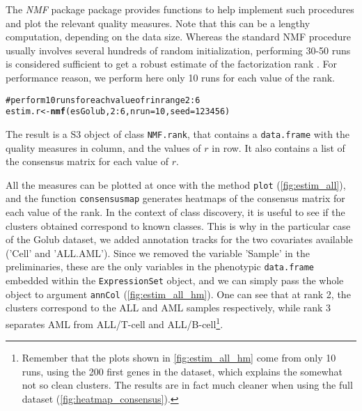 \documentclass[a4paper]{article}\usepackage{graphicx, color}
\makeatletter
\newcommand{\hlfunctioncall}[1]{\textcolor[rgb]{0.501960784313725,0,0.329411764705882}{\textbf{#1}}}%
\newcommand{\hlcomment}[1]{\textcolor[rgb]{0.180392156862745,0.6,0.341176470588235}{#1}}%
\newenvironment{kframe}{%
 \def\at@end@of@kframe{}%
 \ifinner\ifhmode%
  \def\at@end@of@kframe{\end{minipage}}%
  \begin{minipage}{\columnwidth}%
 \fi\fi%
 \def\FrameCommand##1{\hskip\@totalleftmargin \hskip-\fboxsep
 \colorbox{shadecolor}{##1}\hskip-\fboxsep
     \hskip-\linewidth \hskip-\@totalleftmargin \hskip\columnwidth}%
 \MakeFramed {\advance\hsize-\width
   \@totalleftmargin\z@ \linewidth\hsize
   \@setminipage}}%
 {\par\unskip\endMakeFramed%
 \at@end@of@kframe}
\newenvironment{knitrout}{}{} %
\let\code=\texttt
\newcommand{\pkgname}[1]{\textit{#1}\xspace}
\newcommand{\Rpkg}[1]{\pkgname{#1} package\xspace}
\newcommand{\nmfpack}{\Rpkg{NMF}}
\renewcommand{\cite}[1]{\parencite{#1}}
\makeatother
\begin{document}
The \nmfpack package provides functions to help implement such procedures and plot the relevant quality measures.
Note that this can be a lengthy computation, depending on the data size.
Whereas the standard NMF procedure usually involves several hundreds of random initialization, performing 30-50 runs is considered sufficient to get a robust estimate of the factorization rank \cite{Brunet2004, Hutchins2008}.
For performance reason, we perform here only 10 runs for each value of the rank.

\begin{knitrout}
\color{fgcolor}\begin{kframe}
\begin{alltt}
\hlcomment{# perform 10 runs for each value of r in range 2:6}
estim.r <- \hlfunctioncall{nmf}(esGolub, 2:6, nrun = 10, seed = 123456)
\end{alltt}
\end{kframe}
\end{knitrout}


The result is a S3 object of class \code{NMF.rank}, that contains a \code{data.frame} with the quality measures in column, and the values of $r$ in row.
It also contains a list of the consensus matrix for each value of $r$.

All the measures can be plotted at once with the method \code{plot} (\cref{fig:estim_all}), and the function \code{consensusmap} generates heatmaps of the consensus matrix for each value of the rank.
In the context of class discovery, it is useful to see if the clusters obtained correspond to known classes.
This is why in the particular case of the Golub dataset, we added annotation tracks for the two covariates available ('Cell' and 'ALL.AML').
Since we removed the variable 'Sample' in the preliminaries, these are the only variables in the phenotypic \code{data.frame} embedded within the \code{ExpressionSet} object, and we can simply pass the whole object to argument \code{annCol} (\cref{fig:estim_all_hm}).
One can see that at rank 2, the clusters correspond to the ALL and AML samples respectively, while rank 3 separates AML from ALL/T-cell and ALL/B-cell\footnote{Remember that the plots shown in \cref{fig:estim_all_hm} come from only 10 runs, using the 200 first genes in the dataset, which explains the somewhat not so clean clusters.
The results are in fact much cleaner when using the full dataset (\cref{fig:heatmap_consensus}).}.
\end{document}
